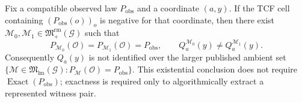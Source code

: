 Fix a compatible observed law \(P_{\mathrm{obs}}\) and a coordinate \((a,y)\). If the TCF cell containing \((P_{\mathrm{obs}}(o))_o\) is negative for that coordinate, then there exist \(\mathcal M_0,\mathcal M_1\in\mathfrak M_{+}^{\mathrm{rm}}(\mathcal G)\) such that
\[
P_{\mathcal M_0}(\mathcal O)=P_{\mathcal M_1}(\mathcal O)=P_{\mathrm{obs}},
\qquad
Q_a^{\mathcal M_0}(y)\neq Q_a^{\mathcal M_1}(y).
\]
Consequently \(Q_a(y)\) is not identified over the larger published ambient set \(\{\mathcal M\in\mathfrak M_{\mathrm{lm}}(\mathcal G):P_{\mathcal M}(\mathcal O)=P_{\mathrm{obs}}\}\). This existential conclusion does not require \(\operatorname{Exact}(P_{\mathrm{obs}})\); exactness is required only to algorithmically extract a represented witness pair.
